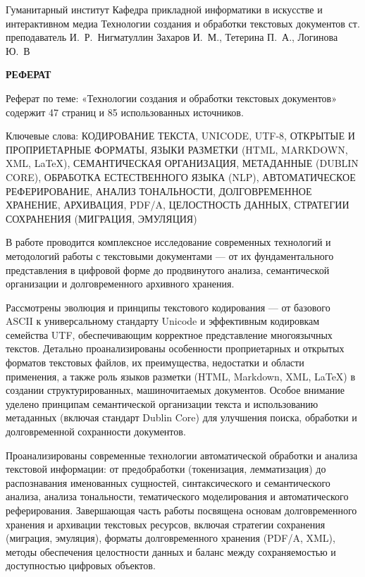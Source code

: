 \documentclass{SibFU-docs}
\begin{document}
\renewcommand{\contentsname}{}
\mycovertitle
{Гуманитарный институт}
{Кафедра прикладной информатики в искусстве и интерактивном медиа}
{Технологии создания и обработки текстовых документов}
{ст. преподаватель И.~Р.~Нигматуллин}
{Захаров И.~М., Тетерина П.~А., Логинова Ю.~В}
 
\begin{center}
\bfseries РЕФЕРАТ
\end{center}
\noindent

Реферат по теме: «Технологии создания и обработки текстовых документов» содержит 47 страниц и 85 использованных источников.

Ключевые слова: КОДИРОВАНИЕ ТЕКСТА, UNICODE, UTF-8, ОТКРЫТЫЕ И ПРОПРИЕТАРНЫЕ ФОРМАТЫ, ЯЗЫКИ РАЗМЕТКИ (HTML, MARKDOWN, XML, LaTeX), СЕМАНТИЧЕСКАЯ ОРГАНИЗАЦИЯ, МЕТАДАННЫЕ (DUBLIN CORE), ОБРАБОТКА ЕСТЕСТВЕННОГО ЯЗЫКА (NLP), АВТОМАТИЧЕСКОЕ РЕФЕРИРОВАНИЕ, АНАЛИЗ ТОНАЛЬНОСТИ, ДОЛГОВРЕМЕННОЕ ХРАНЕНИЕ, АРХИВАЦИЯ, PDF/A, ЦЕЛОСТНОСТЬ ДАННЫХ, СТРАТЕГИИ СОХРАНЕНИЯ (МИГРАЦИЯ, ЭМУЛЯЦИЯ)

В работе проводится комплексное исследование современных технологий и методологий работы с текстовыми документами — от их фундаментального представления в цифровой форме до продвинутого анализа, семантической организации и долговременного архивного хранения.

Рассмотрены эволюция и принципы текстового кодирования — от базового ASCII к универсальному стандарту Unicode и эффективным кодировкам семейства UTF, обеспечивающим корректное представление многоязычных текстов. Детально проанализированы особенности проприетарных и открытых форматов текстовых файлов, их преимущества, недостатки и области применения, а также роль языков разметки (HTML, Markdown, XML, LaTeX) в создании структурированных, машиночитаемых документов. Особое внимание уделено принципам семантической организации текста и использованию метаданных (включая стандарт Dublin Core) для улучшения поиска, обработки и долговременной сохранности документов.

Проанализированы современные технологии автоматической обработки и анализа текстовой информации: от предобработки (токенизация, лемматизация) до распознавания именованных сущностей, синтаксического и семантического анализа, анализа тональности, тематического моделирования и автоматического реферирования. Завершающая часть работы посвящена основам долговременного хранения и архивации текстовых ресурсов, включая стратегии сохранения (миграция, эмуляция), форматы долговременного хранения (PDF/A, XML), методы обеспечения целостности данных и баланс между сохраняемостью и доступностью цифровых объектов.
\end{document}
